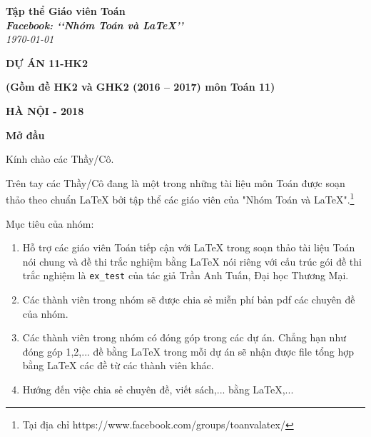 \documentclass[12pt,a4paper,oneside]{article}
\begin{document}
	\begin{titlepage}
		\begin{flushright}
			\fontsize{17}{0}\selectfont
			\textbf{Tập thể Giáo viên Toán}\\
			\textbf{\textit{Facebook: \lq\lq Nhóm Toán và LaTeX\rq\rq}}\\
			\textit{\color{red}\today}
		\end{flushright}
		
		\vspace{4cm}
		
		\begin{flushright}
		\textbf{\fontsize{50}{0}\selectfont DỰ ÁN 11-HK2}
		
		\vspace{1cm}
		
      	\textbf{\fontsize{20}{0}\selectfont (Gồm đề HK2 và GHK2 (2016 -- 2017) môn Toán 11)}		
		\end{flushright}
		
		\vfill{
			\begin{flushright}
				\fontsize{17}{0}\textbf{HÀ NỘI - 2018}
			\end{flushright}
		}
	\end{titlepage}
	
	
	\pagestyle{fancy}
	\rfoot{\thepage}
	\cfoot{\empty}	
	\lfoot{\currfilename}
	\lhead{\currfilename}

\vspace*{1cm}
	
{\bf\LARGE Mở đầu}

\vspace*{1cm}
	
	Kính chào các Thầy/Cô.
	
	\vspace{0.6cm}
	
	\noindent Trên tay các Thầy/Cô đang là một trong những tài liệu môn Toán được soạn thảo theo chuẩn \LaTeX{} bởi tập thể các giáo viên của "Nhóm Toán và LaTeX".\footnote{Tại địa chỉ https://www.facebook.com/groups/toanvalatex/}
	
	\vspace{0.6cm}
	
	\noindent Mục tiêu của nhóm: 
	\begin{enumerate}[\bf 1.]
		\item Hỗ trợ các giáo viên Toán tiếp cận với \LaTeX{} trong soạn thảo tài liệu Toán nói chung và đề thi trắc nghiệm bằng \LaTeX{} nói riêng với cấu trúc gói đề thi trắc nghiệm là \texttt{ex\_test} của tác giả Trần Anh Tuấn, Đại học Thương Mại.
		\item Các thành viên trong nhóm sẽ được chia sẻ miễn phí bản pdf  các chuyên đề của nhóm.
		\item Các thành viên trong nhóm có đóng góp trong các dự án. Chẳng hạn như đóng góp 1,2,... đề bằng \LaTeX{} trong mỗi dự án sẽ nhận được file tổng hợp bằng \LaTeX{} các đề từ các thành viên khác.
		\item Hướng đến việc chia sẻ chuyên đề, viết sách,... bằng \LaTeX,...
    \end{enumerate}	
\end{document}
